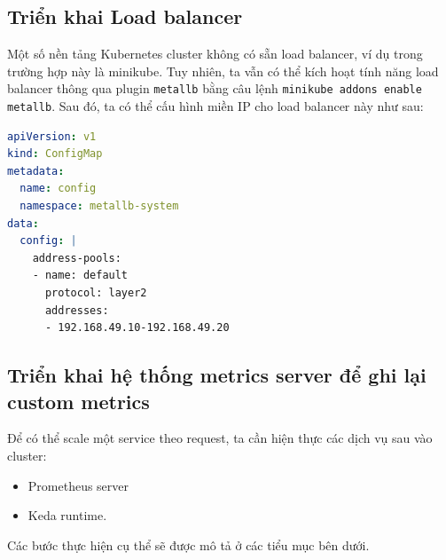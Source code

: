 \subsection{Triển khai Load balancer}
\noindent Một số nền tảng Kubernetes cluster không có sẵn load balancer, ví dụ trong trường hợp này là minikube. Tuy nhiên, ta vẫn có thể kích hoạt tính năng load balancer thông qua plugin \lstinline|metallb| bằng câu lệnh \lstinline|minikube addons enable metallb|. Sau đó, ta có thể cấu hình miền IP cho load balancer này như sau:
\begin{lstlisting}[language=yaml]
apiVersion: v1
kind: ConfigMap
metadata:
  name: config
  namespace: metallb-system
data:
  config: |
    address-pools:
    - name: default
      protocol: layer2
      addresses:
      - 192.168.49.10-192.168.49.20
\end{lstlisting}

\subsection{Triển khai hệ thống metrics server để ghi lại custom metrics}
\noindent Để có thể scale một service theo request, ta cần hiện thực các dịch vụ sau vào cluster:
\begin{itemize}
  \item Prometheus server
  \item Keda runtime.
\end{itemize}
Các bước thực hiện cụ thể sẽ được mô tả ở các tiểu mục bên dưới.
